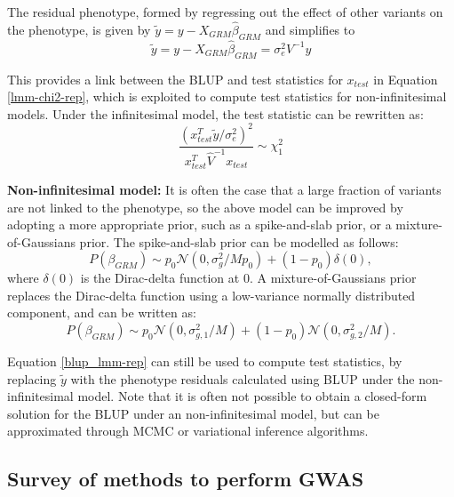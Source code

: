%
The residual phenotype, formed by regressing out the effect of other variants on the phenotype, is given by $\tilde{y} = y - X_{GRM} \hat{\beta}_{GRM}$ and simplifies to
\begin{equation}
    \tilde{y} = y - X_{GRM} \hat{\beta}_{GRM} = \sigma_e^2 V^{-1} y
    \label{blup_lmm_link}
\end{equation}

%
This provides a link between the BLUP and test statistics for $x_{test}$ in Equation \ref{lmm-chi2-rep}, which is exploited to compute test statistics for non-infinitesimal models.
%
Under the infinitesimal model, the test statistic can be rewritten as:
\begin{equation}
    \frac{(x_{test}^T \tilde{y}/\sigma_e^2)^2}{x_{test}^T \hat{V}^{-1} x_{test}} \sim \chi^2_1
    \label{blup_lmm-rep}
\end{equation}

%
%
\textbf{Non-infinitesimal model: }
%
It is often the case that a large fraction of variants are not linked to the phenotype, so the above model can be improved by adopting a more appropriate prior, such as a spike-and-slab prior, or a mixture-of-Gaussians prior.
%
The spike-and-slab prior can be modelled as follows:
\begin{equation}
P(\beta_{GRM}) \sim p_0 \mathcal{N} (0, \sigma_g^2/Mp_0) + (1-p_0) \delta(0),
\end{equation}
where $\delta(0)$ is the Dirac-delta function at $0$.
%
A mixture-of-Gaussians prior replaces the Dirac-delta function using a low-variance normally distributed component, and can be written as:
\begin{equation}
P(\beta_{GRM}) \sim p_0 \mathcal{N} (0, \sigma_{g,1}^2/M) + (1-p_0) \mathcal{N} (0, \sigma_{g,2}^2/M).
\end{equation}

%

%
Equation \ref{blup_lmm-rep} can still be used to compute test statistics, by replacing $\tilde{y}$ with the phenotype residuals calculated using BLUP under the non-infinitesimal model.
%
Note that it is often not possible to obtain a closed-form solution for the BLUP under an non-infinitesimal model, but can be approximated through MCMC or variational inference algorithms.

\subsection{Survey of methods to perform GWAS}

